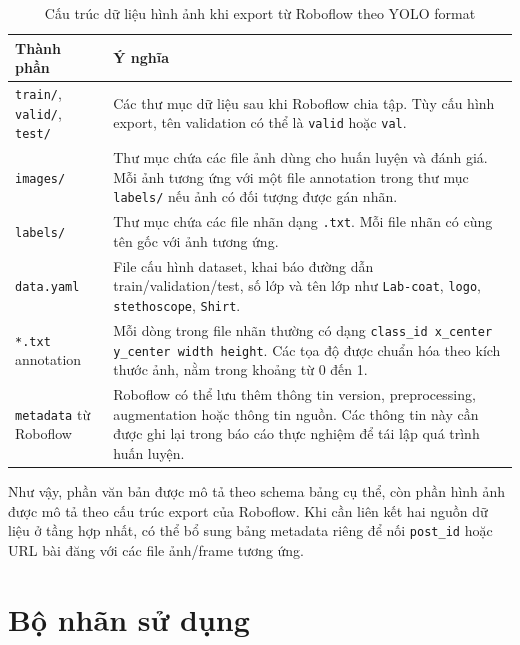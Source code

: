 \begin{table}[H]
\centering
\caption{Cấu trúc dữ liệu hình ảnh khi export từ Roboflow theo YOLO format}
\label{tab:image_data_format}
\begin{tabularx}{\textwidth}{|L{0.32\textwidth}|Y|}
\hline
\textbf{Thành phần} & \textbf{Ý nghĩa} \\
\hline
\texttt{train/}, \texttt{valid/}, \texttt{test/} & Các thư mục dữ liệu sau khi Roboflow chia tập. Tùy cấu hình export, tên validation có thể là \texttt{valid} hoặc \texttt{val}. \\ \hline
\texttt{images/} & Thư mục chứa các file ảnh dùng cho huấn luyện và đánh giá. Mỗi ảnh tương ứng với một file annotation trong thư mục \texttt{labels/} nếu ảnh có đối tượng được gán nhãn. \\ \hline
\texttt{labels/} & Thư mục chứa các file nhãn dạng \texttt{.txt}. Mỗi file nhãn có cùng tên gốc với ảnh tương ứng. \\ \hline
\texttt{data.yaml} & File cấu hình dataset, khai báo đường dẫn train/validation/test, số lớp và tên lớp như \texttt{Lab-coat}, \texttt{logo}, \texttt{stethoscope}, \texttt{Shirt}. \\ \hline
\texttt{*.txt} annotation & Mỗi dòng trong file nhãn thường có dạng \texttt{class\_id x\_center y\_center width height}. Các tọa độ được chuẩn hóa theo kích thước ảnh, nằm trong khoảng từ 0 đến 1. \\ \hline
\texttt{metadata} từ Roboflow & Roboflow có thể lưu thêm thông tin version, preprocessing, augmentation hoặc thông tin nguồn. Các thông tin này cần được ghi lại trong báo cáo thực nghiệm để tái lập quá trình huấn luyện. \\ \hline
\end{tabularx}
\end{table}

Như vậy, phần văn bản được mô tả theo schema bảng cụ thể, còn phần hình ảnh được mô tả theo cấu trúc export của Roboflow. Khi cần liên kết hai nguồn dữ liệu ở tầng hợp nhất, có thể bổ sung bảng metadata riêng để nối \texttt{post\_id} hoặc URL bài đăng với các file ảnh/frame tương ứng.

\section{Bộ nhãn sử dụng}

